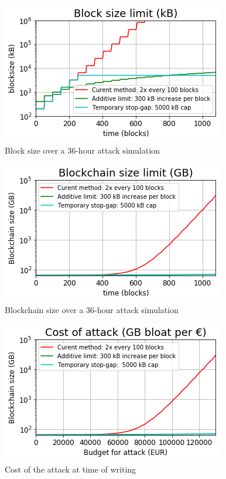 \documentclass{mrl}
\begin{document}
\begin{figure}[p]
    \centering
    \includegraphics[scale=0.7]{fig_block_size.png}
    \caption{Block size over a 36-hour attack simulation}
    \label{fig_block_size}
\end{figure}

\begin{figure}[p]
    \centering
    \includegraphics[scale=0.7]{fig_chain_size.png}
    \caption{Blockchain size over a 36-hour attack simulation}
    \label{fig_chain_size}
\end{figure}

\begin{figure}[p]
    \centering
    \includegraphics[scale=0.7]{fig_bloat_rate.png}
    \caption{Cost of the attack at time of writing}
    \label{fig_bloat_rate}
\end{figure}
\end{document}
